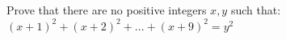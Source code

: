 Prove that there are no positive integers $x, y$ such that: $(x + 1)^2 + (x + 2)^2 +...+ (x + 9)^2 = y^2$
